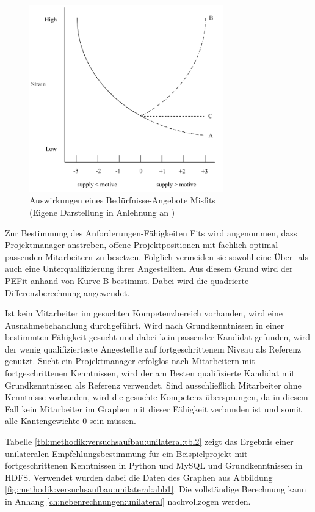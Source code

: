 \begin{figure}[h]
	\centering
	\includegraphics[width=0.75\textwidth]{gfx/ueberschuss_supply_motive.png}
	\caption{Auswirkungen eines Bedürfnisse-Angebote Misfits\\(Eigene Darstellung in Anlehnung an \cite[S. 23]{edwards:2008})}
	\label{fig:methodik:versuchsaufbau:unilateral:abb2}
\end{figure}

Zur Bestimmung des Anforderungen-Fähigkeiten Fits wird angenommen, dass Projektmanager anstreben, offene Projektpositionen mit fachlich optimal passenden Mitarbeitern zu besetzen. Folglich vermeiden sie sowohl eine Über- als auch eine Unterqualifizierung ihrer Angestellten. Aus diesem Grund wird der \ac{PEFit} anhand von Kurve B bestimmt. Dabei wird die quadrierte Differenzberechnung angewendet.

Ist kein Mitarbeiter im gesuchten Kompetenzbereich vorhanden, wird eine Ausnahmebehandlung durchgeführt. Wird nach Grundkenntnissen in einer bestimmten Fähigkeit gesucht und dabei kein passender Kandidat gefunden, wird der wenig qualifizierteste Angestellte auf fortgeschrittenem Niveau als Referenz genutzt. Sucht ein Projektmanager erfolglos nach Mitarbeitern mit fortgeschrittenen Kenntnissen, wird der am Besten qualifizierte Kandidat mit Grundkenntnissen als Referenz verwendet. Sind ausschließlich Mitarbeiter ohne Kenntnisse vorhanden, wird die gesuchte Kompetenz übersprungen, da in diesem Fall kein Mitarbeiter im Graphen mit dieser Fähigkeit verbunden ist und somit alle Kantengewichte 0 sein müssen.

Tabelle \ref{tbl:methodik:versuchsaufbau:unilateral:tbl2} zeigt das Ergebnis einer unilateralen Empfehlungsbestimmung für ein Beispielprojekt mit fortgeschrittenen Kenntnissen in Python und MySQL und Grundkenntnissen in HDFS. Verwendet wurden dabei die Daten des Graphen aus Abbildung \ref{fig:methodik:versuchsaufbau:unilateral:abb1}. Die vollständige Berechnung kann in Anhang \ref{ch:nebenrechnungen:unilateral} nachvollzogen werden.

